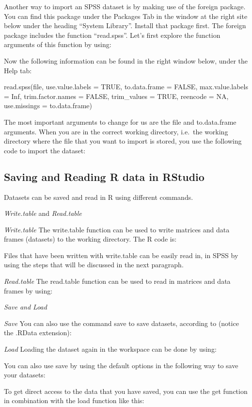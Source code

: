 \documentclass[]{book}
\theoremstyle{definition}
\theoremstyle{definition}
\theoremstyle{definition}
\theoremstyle{remark}
\begin{document}
Another way to import an SPSS dataset is by making use of the foreign
package. You can find this package under the Packages Tab in the window
at the right site below under the heading ``System Library''. Install
that package first. The foreign package includes the function
``read.spss''. Let's first explore the function arguments of this
function by using:

Now the following information can be found in the right window below,
under the Help tab:

read.spss(file, use.value.labels = TRUE, to.data.frame = FALSE,
max.value.labels = Inf, trim.factor.names = FALSE, trim\_values = TRUE,
reencode = NA, use.missings = to.data.frame)

The most important arguments to change for us are the file and
to.data.frame arguments. When you are in the correct working directory,
i.e.~the working directory where the file that you want to import is
stored, you use the following code to import the dataset:

\subsection{Saving and Reading R data in
RStudio}\label{saving-and-reading-r-data-in-rstudio}

Datasets can be saved and read in R using different commands.

\emph{Write.table} and \emph{Read.table}

\emph{Write.table} The write.table function can be used to write
matrices and data frames (datasets) to the working directory. The R code
is:

Files that have been written with write.table can be easily read in, in
SPSS by using the steps that will be discussed in the next paragraph.

\emph{Read.table} The read.table function can be used to read in
matrices and data frames by using:

\emph{Save and Load}

\emph{Save} You can also use the command save to save datasets,
according to (notice the .RData extension):

\emph{Load} Loading the dataset again in the workspace can be done by
using:

You can also use save by using the default options in the following way
to save your datasets:

To get direct access to the data that you have saved, you can use the
get function in combination with the load function like this:
\end{document}

